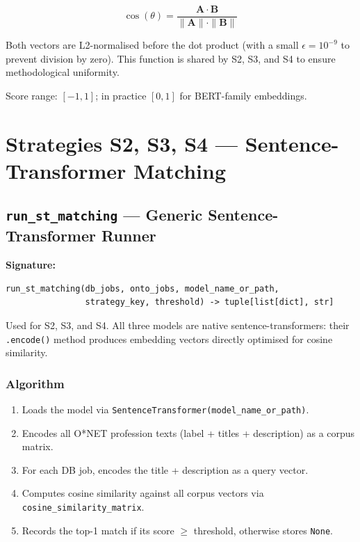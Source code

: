 ﻿\documentclass[12pt,a4paper]{article}
\begin{document}
\begin{equation}
  \cos(\theta) = \frac{\mathbf{A} \cdot \mathbf{B}}{\|\mathbf{A}\| \cdot \|\mathbf{B}\|}
\end{equation}

Both vectors are L2-normalised before the dot product (with a small $\epsilon = 10^{-9}$ to prevent division by zero). This function is shared by S2, S3, and S4 to ensure methodological uniformity.

Score range: $[-1, 1]$; in practice $[0, 1]$ for BERT-family embeddings.

\clearpage
\section{Strategies S2, S3, S4 --- Sentence-Transformer Matching}

\subsection{\texttt{run\_st\_matching} --- Generic Sentence-Transformer Runner}

\textbf{Signature:}
\begin{lstlisting}
run_st_matching(db_jobs, onto_jobs, model_name_or_path,
                strategy_key, threshold) -> tuple[list[dict], str]
\end{lstlisting}

Used for S2, S3, and S4. All three models are native sentence-transformers: their \texttt{.encode()} method produces embedding vectors directly optimised for cosine similarity.

\subsubsection*{Algorithm}
\begin{enumerate}[noitemsep]
  \item Loads the model via \texttt{SentenceTransformer(model\_name\_or\_path)}.
  \item Encodes all O*NET profession texts (label + titles + description) as a corpus matrix.
  \item For each DB job, encodes the title + description as a query vector.
  \item Computes cosine similarity against all corpus vectors via \texttt{cosine\_similarity\_matrix}.
  \item Records the top-1 match if its score $\geq$ threshold, otherwise stores \texttt{None}.
\end{enumerate}
\end{document}
